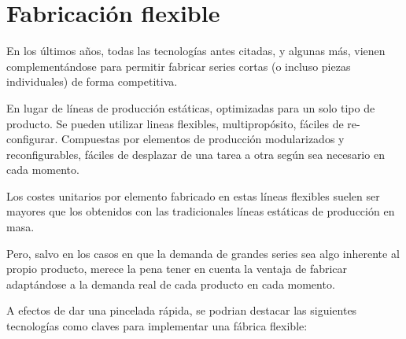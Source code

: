 \documentclass[spanish,12pt,a4paper,final,oneside]{book}
\begin{document}
\section{Fabricación flexible}
En los últimos años, todas las tecnologías antes citadas, y algunas más, vienen complementándose para permitir fabricar  series cortas (o incluso piezas individuales) de forma competitiva. 

En lugar de líneas de producción estáticas, optimizadas para un solo tipo de producto. Se pueden utilizar lineas flexibles, multipropósito, fáciles de re-configurar. Compuestas por elementos de producción modularizados y reconfigurables, fáciles de desplazar de una tarea a otra según sea necesario en cada momento. 

Los costes unitarios por elemento fabricado en estas líneas flexibles suelen ser mayores que los obtenidos con las tradicionales líneas estáticas de producción en masa.

Pero, salvo en los casos en que la demanda de grandes series sea algo inherente al propio producto, merece la pena tener en cuenta la ventaja de fabricar adaptándose a la demanda real de cada producto en cada momento.

A efectos de dar una pincelada rápida, se podrian destacar las siguientes tecnologías como claves para implementar una fábrica flexible:
\end{document}
